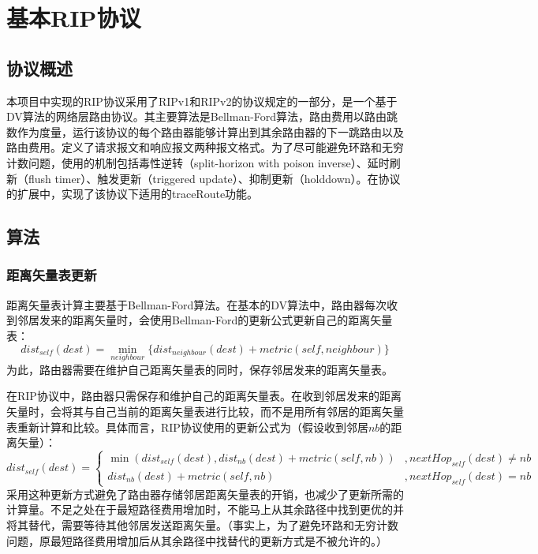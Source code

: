 \section{基本RIP协议} %
\label{sec:rip}
	\subsection{协议概述} %
	\label{sub:协议概述}
		本项目中实现的RIP协议采用了RIPv1和RIPv2的协议规定的一部分，是一个基于DV算法的网络层路由协议。其主要算法是Bellman-Ford算法，路由费用以路由跳数作为度量，运行该协议的每个路由器能够计算出到其余路由器的下一跳路由以及路由费用。定义了请求报文和响应报文两种报文格式。为了尽可能避免环路和无穷计数问题，使用的机制包括毒性逆转（split-horizon with poison inverse）、延时刷新（flush timer）、触发更新（triggered update）、抑制更新（holddown）。在协议的扩展中，实现了该协议下适用的traceRoute功能。
	\subsection{算法} %
	\label{sub:算法}
		\subsubsection{距离矢量表更新}
		\label{ssub:距离矢量表更新}
		距离矢量表计算主要基于Bellman-Ford算法。在基本的DV算法中，路由器每次收到邻居发来的距离矢量时，会使用Bellman-Ford的更新公式更新自己的距离矢量表：$$ dist_{self}(dest) = \min_{neighbour}\{dist_{neighbour}(dest) + metric(self,neighbour)\} $$ 为此，路由器需要在维护自己距离矢量表的同时，保存邻居发来的距离矢量表。
		\par 在RIP协议中，路由器只需保存和维护自己的距离矢量表。在收到邻居发来的距离矢量时，会将其与自己当前的距离矢量表进行比较，而不是用所有邻居的距离矢量表重新计算和比较。具体而言，RIP协议使用的更新公式为（假设收到邻居$nb$的距离矢量）：$$ dist_{self}(dest) = \begin{cases} \min( dist_{self}(dest), dist_{nb}(dest) + metric(self,nb) ) & , nextHop_{self}(dest) \neq nb \\ dist_{nb}(dest) + metric(self,nb) & , nextHop_{self}(dest) = nb \end{cases}$$ 采用这种更新方式避免了路由器存储邻居距离矢量表的开销，也减少了更新所需的计算量。不足之处在于最短路径费用增加时，不能马上从其余路径中找到更优的并将其替代，需要等待其他邻居发送距离矢量。（事实上，为了避免环路和无穷计数问题，原最短路径费用增加后从其余路径中找替代的更新方式是不被允许的。）
